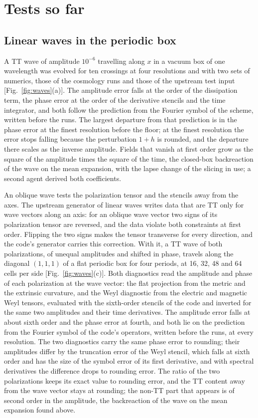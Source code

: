 \documentclass[aps,prd,twocolumn,10pt,superscriptaddress,nofootinbib,longbibliography,floatfix]{revtex4-2}
\begin{document}
\section{Tests so far}\label{sec:tests}

\subsection{Linear waves in the periodic box}\label{sec:linear}

A TT wave of amplitude $10^{-6}$ travelling along $x$ in a vacuum box of one wavelength was evolved for ten crossings at four resolutions and with two sets of numerics, those of the cosmology runs and those of the upstream test input [Fig.~\ref{fig:waves}(a)]. The amplitude error falls at the order of the dissipation term, the phase error at the order of the derivative stencils and the time integrator, and both follow the prediction from the Fourier symbol of the scheme, written before the runs. The largest departure from that prediction is in the phase error at the finest resolution before the floor; at the finest resolution the error stops falling because the perturbation $1+h$ is rounded, and the departure there scales as the inverse amplitude. Fields that vanish at first order grow as the square of the amplitude times the square of the time, the closed-box backreaction of the wave on the mean expansion, with the lapse change of the slicing in use; a second agent derived both coefficients.

An oblique wave tests the polarization tensor and the stencils away from the axes. The upstream generator of linear waves writes data that are TT only for wave vectors along an axis: for an oblique wave vector two signs of its polarization tensor are reversed, and the data violate both constraints at first order. Flipping the two signs makes the tensor transverse for every direction, and the code's generator carries this correction. With it, a TT wave of both polarizations, of unequal amplitudes and shifted in phase, travels along the diagonal $(1,1,1)$ of a flat periodic box for four periods, at 16, 32, 48 and 64 cells per side [Fig.~\ref{fig:waves}(c)]. Both diagnostics read the amplitude and phase of each polarization at the wave vector: the flat projection from the metric and the extrinsic curvature, and the Weyl diagnostic from the electric and magnetic Weyl tensors, evaluated with the sixth-order stencils of the code and inverted for the same two amplitudes and their time derivatives. The amplitude error falls at about sixth order and the phase error at fourth, and both lie on the prediction from the Fourier symbol of the code's operators, written before the runs, at every resolution. The two diagnostics carry the same phase error to rounding; their amplitudes differ by the truncation error of the Weyl stencil, which falls at sixth order and has the size of the symbol error of its first derivative, and with spectral derivatives the difference drops to rounding error. The ratio of the two polarizations keeps its exact value to rounding error, and the TT content away from the wave vector stays at rounding; the non-TT part that appears is of second order in the amplitude, the backreaction of the wave on the mean expansion found above.
\end{document}
